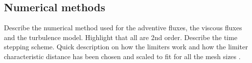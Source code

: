 
\subsection*{Numerical methods}
Describe the numerical method used for the adventive fluxes, the viscous fluxes and the turbulence model. Highlight that all are 2nd order. Describe the time stepping scheme\cite{Palacios:2014,PalaciosEconomon:2014}.
Quick description on how the limiters work and how the limiter characteristic distance has been chosen and scaled to fit for all the mesh sizes \cite{Venkatakrishnan:1993}.